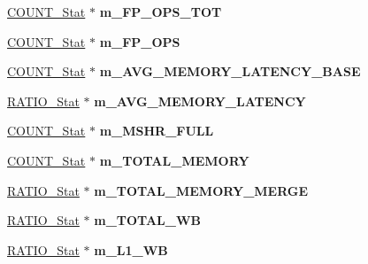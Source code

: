 \begin{DoxyCompactItemize}
\item 
\hypertarget{classall__stats__c_abe88e55cc9b826ce005904bc553292af}{
\hyperlink{classCOUNT__Stat}{COUNT\_\-Stat} $\ast$ {\bfseries m\_\-FP\_\-OPS\_\-TOT}}
\label{classall__stats__c_abe88e55cc9b826ce005904bc553292af}

\item 
\hypertarget{classall__stats__c_ad0656f32c8a361bd10361531b2e93d80}{
\hyperlink{classCOUNT__Stat}{COUNT\_\-Stat} $\ast$ {\bfseries m\_\-FP\_\-OPS}}
\label{classall__stats__c_ad0656f32c8a361bd10361531b2e93d80}

\item 
\hypertarget{classall__stats__c_af71f51f36d164ddef7ba39786ff2dcef}{
\hyperlink{classCOUNT__Stat}{COUNT\_\-Stat} $\ast$ {\bfseries m\_\-AVG\_\-MEMORY\_\-LATENCY\_\-BASE}}
\label{classall__stats__c_af71f51f36d164ddef7ba39786ff2dcef}

\item 
\hypertarget{classall__stats__c_a22726a5e9d20ca99b62ab7eb71d7d087}{
\hyperlink{classRATIO__Stat}{RATIO\_\-Stat} $\ast$ {\bfseries m\_\-AVG\_\-MEMORY\_\-LATENCY}}
\label{classall__stats__c_a22726a5e9d20ca99b62ab7eb71d7d087}

\item 
\hypertarget{classall__stats__c_a35ed2e1c989d625c7f7264843918cd98}{
\hyperlink{classCOUNT__Stat}{COUNT\_\-Stat} $\ast$ {\bfseries m\_\-MSHR\_\-FULL}}
\label{classall__stats__c_a35ed2e1c989d625c7f7264843918cd98}

\item 
\hypertarget{classall__stats__c_ad0763a32c0bedfe7c9628e5c3a0f4caa}{
\hyperlink{classCOUNT__Stat}{COUNT\_\-Stat} $\ast$ {\bfseries m\_\-TOTAL\_\-MEMORY}}
\label{classall__stats__c_ad0763a32c0bedfe7c9628e5c3a0f4caa}

\item 
\hypertarget{classall__stats__c_a8fe00231f0710861623e00c587c6a019}{
\hyperlink{classRATIO__Stat}{RATIO\_\-Stat} $\ast$ {\bfseries m\_\-TOTAL\_\-MEMORY\_\-MERGE}}
\label{classall__stats__c_a8fe00231f0710861623e00c587c6a019}

\item 
\hypertarget{classall__stats__c_a006440e5527b08220b77ef16b0692606}{
\hyperlink{classRATIO__Stat}{RATIO\_\-Stat} $\ast$ {\bfseries m\_\-TOTAL\_\-WB}}
\label{classall__stats__c_a006440e5527b08220b77ef16b0692606}

\item 
\hypertarget{classall__stats__c_aa3cee4c1c4354f02239ae0f47f4b1096}{
\hyperlink{classRATIO__Stat}{RATIO\_\-Stat} $\ast$ {\bfseries m\_\-L1\_\-WB}}
\label{classall__stats__c_aa3cee4c1c4354f02239ae0f47f4b1096}


\end{DoxyCompactItemize}
